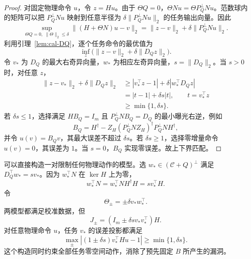 \documentclass[11pt,a4paper]{article}
\numberwithin{equation}{section}
\theoremstyle{definition}
\begin{document}
\begin{proof}
对固定物理命令 $u$，令 $z=Hu$。由于 $\Theta Q=0$，$\Theta Nu=\Theta P_Q^\perp Nu$。范数球内的矩阵可以把 $P_Q^\perp Nu$ 映射到任意半径为 $\delta\|P_Q^\perp Nu\|_2$ 的任务输出向量。因此
\begin{equation}
  \sup_{\Theta Q=0,\;\|\Theta\|_2\le\delta}
  \|(H+\Theta N)u-v\|_2
  =
  \|z-v\|_2+\delta\|P_Q^\perp Nu\|_2 .
  \label{eq:cal-task-ball}
\end{equation}
利用引理~\ref{lem:cal-DQ}，逐个任务命令的最优值为
\begin{equation}
  \inf_z\big(\|z-v\|_2+\delta\|D_Qz\|_2\big).
  \label{eq:cal-task-prox}
\end{equation}
令 $v_*$ 为 $D_Q$ 的最大右奇异向量，$w_*$ 为相应左奇异向量，$s=\|D_Q\|_2$。当 $s>0$ 时，对任意 $z$，
\begin{align}
  \|z-v_*\|_2+\delta\|D_Qz\|_2
  &\ge
  |v_*^\top z-1|
  +\delta|w_*^\top D_Qz|\\
  &=
  |t-1|+\delta s|t|,
  \qquad t=v_*^\top z\\
  &\ge\min\{1,\delta s\}.
\end{align}
若 $\delta s\le1$，选择满足 $HB_Q=I_m$ 且 $P_Q^\perp NB_Q=D_Q$ 的最小曝光右逆，例如
\begin{equation}
  B_Q=
  H^\dagger-
  Z_H(P_Q^\perp NZ_H)^\dagger
  P_Q^\perp NH^\dagger ,
  \label{eq:cal-BQ}
\end{equation}
并令 $u(v)=B_Qv$，其最大误差不超过 $\delta s$。若 $\delta s\ge1$，选择零增量命令 $u(v)=0$，其误差为 $1$。当 $s=0$，$B_Q$ 实现零误差。故上下界匹配。
\end{proof}

可以直接构造一对限制任何物理动作的模型。选 $w_*\in(\mathcal C+Q)^\perp$ 满足 $D_Q^\top w_*=sv_*$。因为 $w_*^\top N$ 在 $\ker H$ 上为零，
\begin{equation}
  w_*^\top N
  =w_*^\top NH^\dagger H
  =sv_*^\top H .
  \label{eq:cal-adversary-factor}
\end{equation}
令
\begin{equation}
  \Theta_\pm=\pm\delta v_*w_*^\top .
\end{equation}
两模型都满足校准数据，但
\begin{equation}
  J_\pm=
  (I_m\pm\delta s v_*v_*^\top)H .
  \label{eq:cal-adversary-J}
\end{equation}
对任意物理命令 $u$，任务 $v_*$ 的误差投影都满足
\begin{equation}
  \max_{\pm}
  \left|
  (1\pm\delta s)v_*^\top Hu-1
  \right|
  \ge\min\{1,\delta s\}.
  \label{eq:cal-anyphysical-lower}
\end{equation}
这个构造同时约束全部任务零空间动作，消除了预先固定 $B$ 所产生的漏洞。
\end{document}
